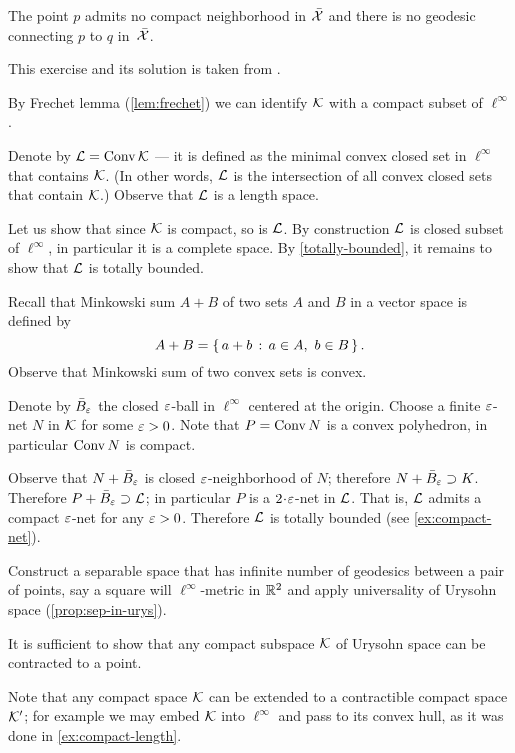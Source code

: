 The point $p$ admits no compact neighborhood in $\bar{\mathcal{X}}$ 
and there is no geodesic connecting $p$ to $q$ in~$\bar{\mathcal{X}}$. \qeds

This exercise and its solution is taken from \cite{bridson-haefliger}.



 By Frechet lemma (\ref{lem:frechet}) we can identify $\mathcal{K}$ with a compact subset of $\ell^\infty$.

Denote by $\mathcal{L}=\mathop{\rm Conv}\nolimits\mathcal{K}$ --- it is defined as the minimal convex closed set in $\ell^\infty$ that contains $\mathcal{K}$.
(In other words, $\mathcal{L}$ is the intersection of all convex closed sets that contain $\mathcal{K}$.)
Observe that $\mathcal{L}$ is a length space.

Let us show that since $\mathcal{K}$ is compact, so is $\mathcal{L}$.
By construction $\mathcal{L}$ is closed subset of $\ell^\infty$, in particular it is a complete space.
By \ref{totally-bounded}, it remains to show that $\mathcal{L}$ is totally bounded.

Recall that Minkowski sum $A + B$ of two sets $A$ and $B$ in a vector space is defined by
\[A + B = \left\{\,{a+b}\,:\,{a\in A,\ b\in B}\,\right\}.\]
Observe that Minkowski sum of two convex sets is convex.

Denote by $\bar B_\varepsilon$ the closed $\varepsilon$-ball in $\ell^\infty$ centered at the origin.
Choose a finite $\varepsilon$-net $N$ in $\mathcal{K}$ for some $\varepsilon>0$.
Note that $P=\mathop{\rm Conv}\nolimits N$ is a convex polyhedron, in particular $\mathop{\rm Conv}\nolimits N$ is compact.

Observe that $N+\bar B_\varepsilon$ is closed $\varepsilon$-neighborhood of $N$;
therefore $N+\bar B_\varepsilon\supset K$.
Therefore $P+\bar B_\varepsilon\supset \mathcal{L}$;
in particular $P$ is a $2\cdot\eps$-net in $\mathcal{L}$.
That is, $\mathcal{L}$ admits a compact $\varepsilon$-net for any $\varepsilon>0$.
Therefore $\mathcal{L}$ is totally bounded (see \ref{ex:compact-net}).

Construct a separable space that has infinite number of geodesics between a pair of points, say a square will $\ell^\infty$-metric in $\mathbb{R}^2$ and apply universality of Urysohn space (\ref{prop:sep-in-urys}).

It is sufficient to show that any compact subspace $\mathcal{K}$ of Urysohn space can be contracted to a point.

Note that any compact space $\mathcal{K}$ can be extended to a contractible compact space $\mathcal{K}'$; for example we may embed $\mathcal{K}$ into $\ell^\infty$ and pass to its convex hull, as it was done in \ref{ex:compact-length}.


